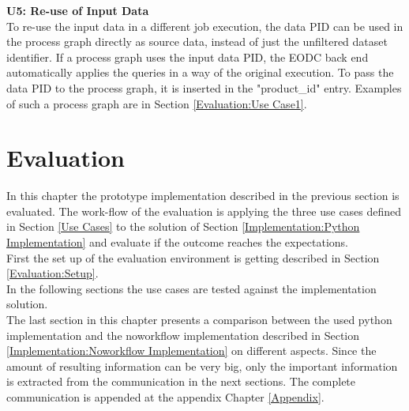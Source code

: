 \documentclass[draft,final]{vutinfth} %
\begin{document}
\textbf{U5: Re-use of Input Data} \\
To re-use the input data in a different job execution, the data PID can be used in the process graph directly as source data, instead of just the unfiltered dataset identifier. If a process graph uses the input data PID, the EODC back end automatically applies the queries in a way of the original execution. To pass the data PID to the process graph, it is inserted in the "product\_id" entry. Examples of such a process graph are in Section \ref{Evaluation:Use Case1}.  


\chapter{Evaluation}\label{Evaluation}
In this chapter the prototype implementation described in the previous section is evaluated. The work-flow of the evaluation is applying the three use cases defined in Section \ref{Use Cases} to the solution of Section \ref{Implementation:Python Implementation} and evaluate if the outcome reaches the expectations.\\ First the set up of the evaluation environment is getting described in Section \ref{Evaluation:Setup}.\\ In the following sections the use cases are tested against the implementation solution.\\ The last section in this chapter presents a comparison between the used python implementation and the noworkflow implementation described in Section \ref{Implementation:Noworkflow Implementation} on different aspects. Since the amount of resulting information can be very big, only the important information is extracted from the communication in the next sections. The complete communication is appended at the appendix Chapter \ref{Appendix}. 
\end{document}
